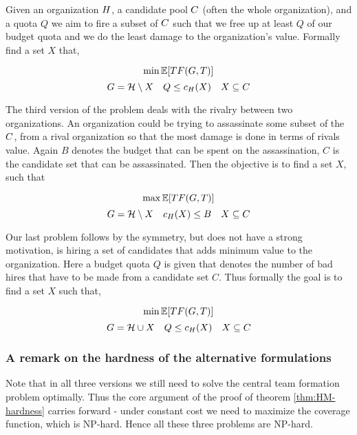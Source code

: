 Given an organization ${H}$, a candidate pool ${C}$ (often the whole organization), and a quota $Q$ we aim to fire a subset of ${C}$ such that we free up at least $Q$ of our budget quota and we do the least damage to the organization's value. Formally find a set $X$ that, 

$$ \min \mathbb{E}[TF(G,T)] $$
$$ G = \mathcal{H} \setminus X \quad Q \le c_H(X) \quad  X \subseteq C $$

The third version of the problem deals with the rivalry between two organizations. An organization could be trying to assassinate some subset of the ${C}$, from a rival organization so that the most damage is done in terms of rivals value. Again $B$ denotes the budget that can be spent on the assassination, $C$ is the candidate set that can be assassinated. Then the objective is to find a set $X$, such that

$$ \max \mathbb{E}[TF(G,T)] $$
$$ G = \mathcal{H} \setminus X \quad c_H(X) \le B \quad  X \subseteq C $$

Our last problem follows by the symmetry, but does not have a strong motivation, is hiring a set of candidates that adds minimum value to the organization. Here a budget quota $Q$ is given that denotes the number of bad hires that have to be made from a candidate set $C$. Thus formally the goal is to find a set $X$ such that,

$$ \min \mathbb{E}[TF(G,T)] $$
$$ G = \mathcal{H} \cup X \quad Q \le c_H(X) \quad  X \subseteq C $$

\subsubsection{A remark on the hardness of the alternative formulations}

Note that in all three versions we still need to solve the central team formation problem optimally. Thus the core argument of the proof of theorem \ref{thm:HM-hardness} carries forward - under constant cost we need to maximize the coverage function, which is NP-hard. Hence all these three problems are NP-hard.